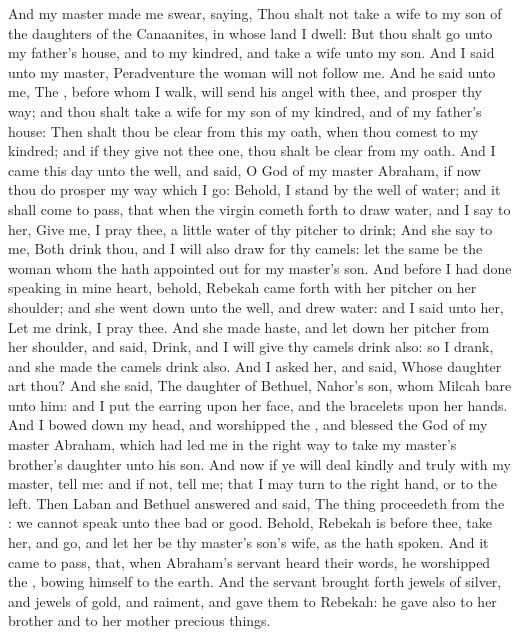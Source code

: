 \begin{biblechapter}
\verse And my master made me swear, saying, Thou shalt not take a wife to my son of the daughters of the Canaanites, in whose land I dwell:
\verse But thou shalt go unto my father's house, and to my kindred, and take a wife unto my son.
\verse And I said unto my master, Peradventure the woman will not follow me.
\verse And he said unto me, The \LORD, before whom I walk, will send his angel with thee, and prosper thy way; and thou shalt take a wife for my son of my kindred, and of my father's house:
\verse Then shalt thou be clear from this my oath, when thou comest to my kindred; and if they give not thee one, thou shalt be clear from my oath.
\verse And I came this day unto the well, and said, O \LORD God of my master Abraham, if now thou do prosper my way which I go:
\verse Behold, I stand by the well of water; and it shall come to pass, that when the virgin cometh forth to draw water, and I say to her, Give me, I pray thee, a little water of thy pitcher to drink;
\verse And she say to me, Both drink thou, and I will also draw for thy camels: let the same be the woman whom the \LORD hath appointed out for my master's son.
\verse And before I had done speaking in mine heart, behold, Rebekah came forth with her pitcher on her shoulder; and she went down unto the well, and drew water: and I said unto her, Let me drink, I pray thee.
\verse And she made haste, and let down her pitcher from her shoulder, and said, Drink, and I will give thy camels drink also: so I drank, and she made the camels drink also.
\verse And I asked her, and said, Whose daughter art thou? And she said, The daughter of Bethuel, Nahor's son, whom Milcah bare unto him: and I put the earring upon her face, and the bracelets upon her hands.
\verse And I bowed down my head, and worshipped the \LORD, and blessed the \LORD God of my master Abraham, which had led me in the right way to take my master's brother's daughter unto his son.
\verse And now if ye will deal kindly and truly with my master, tell me: and if not, tell me; that I may turn to the right hand, or to the left.
\verse Then Laban and Bethuel answered and said, The thing proceedeth from the \LORD: we cannot speak unto thee bad or good.
\verse Behold, Rebekah is before thee, take her, and go, and let her be thy master's son's wife, as the \LORD hath spoken.
\verse And it came to pass, that, when Abraham's servant heard their words, he worshipped the \LORD, bowing himself to the earth.
\verse And the servant brought forth jewels of silver, and jewels of gold, and raiment, and gave them to Rebekah: he gave also to her brother and to her mother precious things.

\end{biblechapter}
